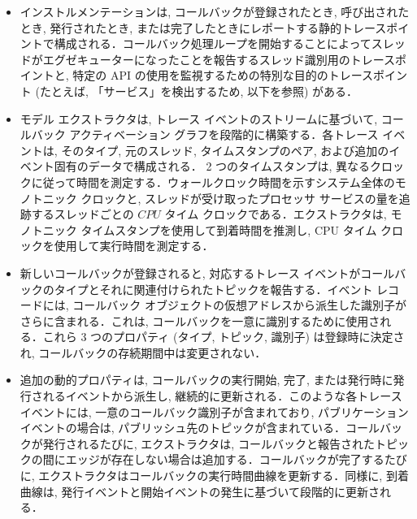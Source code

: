 \begin{frame}{}
    \begin{itemize}
        \item インストルメンテーションは, コールバックが登録されたとき, 呼び出されたとき, 発行されたとき, または完了したときにレポートする静的トレースポイントで構成される．コールバック処理ループを開始することによってスレッドがエグゼキューターになったことを報告するスレッド識別用のトレースポイントと, 特定の API の使用を監視するための特別な目的のトレースポイント (たとえば, 「サービス」を検出するため, 以下を参照) がある．
    \end{itemize}
\end{frame}

\begin{frame}{}
    \begin{itemize}
        \item モデル エクストラクタは, トレース イベントのストリームに基づいて, コールバック アクティベーション グラフを段階的に構築する．各トレース イベントは, そのタイプ, 元のスレッド, タイムスタンプのペア, および追加のイベント固有のデータで構成される． 2 つのタイムスタンプは, 異なるクロックに従って時間を測定する．ウォールクロック時間を示すシステム全体のモノトニック クロックと, スレッドが受け取ったプロセッサ サービスの量を追跡するスレッドごとの $C P U$ タイム クロックである．エクストラクタは, モノトニック タイムスタンプを使用して到着時間を推測し, CPU タイム クロックを使用して実行時間を測定する．
    \end{itemize}
\end{frame}

\begin{frame}{}
    \begin{itemize}
        \item 新しいコールバックが登録されると, 対応するトレース イベントがコールバックのタイプとそれに関連付けられたトピックを報告する．イベント レコードには, コールバック オブジェクトの仮想アドレスから派生した識別子がさらに含まれる．これは, コールバックを一意に識別するために使用される．これら 3 つのプロパティ (タイプ, トピック, 識別子) は登録時に決定され, コールバックの存続期間中は変更されない．
    \end{itemize}
\end{frame}

\begin{frame}{}
    \begin{itemize}
        \item 追加の動的プロパティは, コールバックの実行開始, 完了, または発行時に発行されるイベントから派生し, 継続的に更新される．このような各トレース イベントには, 一意のコールバック識別子が含まれており, パブリケーション イベントの場合は, パブリッシュ先のトピックが含まれている．コールバックが発行されるたびに, エクストラクタは, コールバックと報告されたトピックの間にエッジが存在しない場合は追加する．コールバックが完了するたびに, エクストラクタはコールバックの実行時間曲線を更新する．同様に, 到着曲線は, 発行イベントと開始イベントの発生に基づいて段階的に更新される．
    \end{itemize}
\end{frame}

